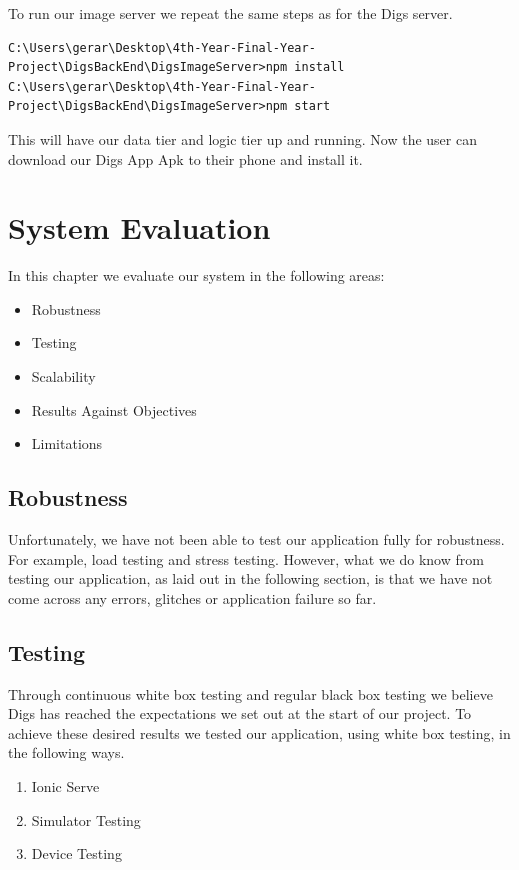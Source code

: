 \noindent To run our image server we repeat the same steps as for the Digs server.

\begin{verbatim}
C:\Users\gerar\Desktop\4th-Year-Final-Year-Project\DigsBackEnd\DigsImageServer>npm install
C:\Users\gerar\Desktop\4th-Year-Final-Year-Project\DigsBackEnd\DigsImageServer>npm start
\end{verbatim}

\noindent This will have our data tier and logic tier up and running. Now the user can download our Digs App Apk to their phone and install it.  








\chapter{System Evaluation}

In this chapter we evaluate our system in the following areas:
\begin{itemize}
    \item Robustness
    \item Testing
    \item Scalability
    \item Results Against Objectives
    \item Limitations
\end{itemize}

\section{Robustness}
Unfortunately, we have not been able to test our application fully for robustness. For example, load testing and stress testing. However, what we do know from testing our application, as laid out in the following section, is that we have not come across any errors, glitches or application failure so far. 

\section{Testing} \label{testing}
Through continuous white box testing and regular black box testing we believe Digs has reached the expectations we set out at the start of our project. To achieve these desired results we tested our application, using white box testing, in the following ways.

\begin{enumerate}
  \item Ionic Serve
  \item Simulator Testing
  \item Device Testing
\end{enumerate}


